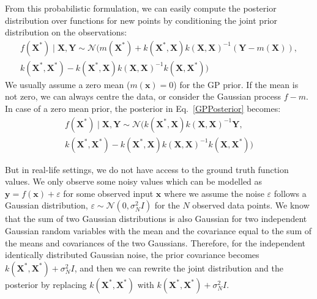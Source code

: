 From this probabilistic formulation, we can easily compute the posterior distribution over functions for new points by conditioning the joint prior distribution on the observations:
\begin{equation}\label{GPPosterior}
    \begin{aligned}
        f\left(\mathbf{X^*}\right) \mid \mathbf{X, Y} \sim \mathcal{N}(m\left(\mathbf{X^*}\right)+k\left(\mathbf{X^*}, \mathbf{X}\right) k\left(\mathbf{X}, \mathbf{X}\right)^{-1}\left(\mathbf{Y}-m\left(\mathbf{X}\right)\right),\\
        k\left(\mathbf{X^*}, \mathbf{X^*}\right)-k\left(\mathbf{X^*}, \mathbf{X}\right) k\left(\mathbf{X}, \mathbf{X}\right)^{-1} k\left(\mathbf{X}, \mathbf{X^*}\right))
    \end{aligned}
\end{equation}
We usually assume a zero mean ($m(\mathbf{x})=0$) for the GP prior. If the mean is not zero, we can always centre the data, or consider the Gaussian process $f-m$. In case of a zero mean prior, the posterior in Eq.~\ref{GPPosterior} becomes:
\begin{equation}\label{GPPosterior}
    \begin{aligned}
        f\left(\mathbf{X^*}\right) \mid \mathbf{X, Y} \sim \mathcal{N}(k\left(\mathbf{X^*}, \mathbf{X}\right) k\left(\mathbf{X}, \mathbf{X}\right)^{-1}\mathbf{Y}, \\
        k\left(\mathbf{X^*}, \mathbf{X^*}\right)-k\left(\mathbf{X^*}, \mathbf{X}\right) k\left(\mathbf{X}, \mathbf{X}\right)^{-1} k\left(\mathbf{X}, \mathbf{X^*}\right))
    \end{aligned}
\end{equation}

But in real-life settings, we do not have access to the ground truth function values. We only observe some noisy values which can be modelled as $\mathbf{y} = f(\mathbf{x}) + \varepsilon$ for some observed input $\mathbf{x}$ where we assume the noise $\varepsilon$ follows a Gaussian distribution, $\varepsilon \sim \mathcal{N}(0, \sigma^2_N I)$ for the $N$ observed data points. We know that the sum of two Gaussian distributions is also Gaussian for two independent Gaussian random variables with the mean and the covariance equal to the sum of the means and covariances of the two Gaussians. Therefore, for the independent identically distributed Gaussian noise, the prior covariance becomes $k\left(\mathbf{X^*}, \mathbf{X^*}\right) + \sigma^2_N I$, and then we can rewrite the joint distribution and the posterior by replacing $k\left(\mathbf{X^*}, \mathbf{X^*}\right)$  with $k\left(\mathbf{X^*}, \mathbf{X^*}\right) + \sigma^2_N I$.

